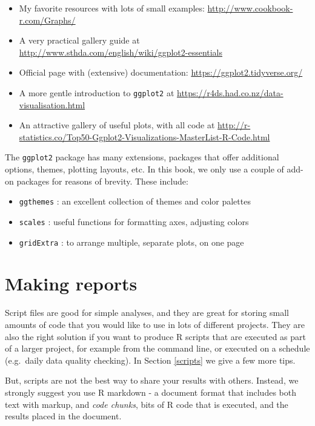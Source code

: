 \documentclass[]{book}
\providecommand{\tightlist}{%
  \setlength{\itemsep}{0pt}\setlength{\parskip}{0pt}}
\begin{document}
\begin{itemize}
\tightlist
\item
  My favorite resources with lots of small examples: \url{http://www.cookbook-r.com/Graphs/}
\item
  A very practical gallery guide at \url{http://www.sthda.com/english/wiki/ggplot2-essentials}
\item
  Official page with (extensive) documentation: \url{https://ggplot2.tidyverse.org/}
\item
  A more gentle introduction to \texttt{ggplot2} at \url{https://r4ds.had.co.nz/data-visualisation.html}
\item
  An attractive gallery of useful plots, with all code at \url{http://r-statistics.co/Top50-Ggplot2-Visualizations-MasterList-R-Code.html}
\end{itemize}

The \texttt{ggplot2} package has many extensions, packages that offer additional options, themes, plotting layouts, etc. In this book, we only use a couple of add-on packages for reasons of brevity. These include:

\begin{itemize}
\tightlist
\item
  \texttt{ggthemes} : an excellent collection of themes and color palettes
\item
  \texttt{scales} : useful functions for formatting axes, adjusting colors
\item
  \texttt{gridExtra} : to arrange multiple, separate plots, on one page
\end{itemize}

\hypertarget{rmarkdown}{%
\section{Making reports}\label{rmarkdown}}

Script files are good for simple analyses, and they are great for storing small amounts of code that you would like to use in lots of different projects. They are also the right solution if you want to produce R scripts that are executed as part of a larger project, for example from the command line, or executed on a schedule (e.g.~daily data quality checking). In Section \ref{scripts} we give a few more tips.

But, scripts are not the best way to share your results with others. Instead, we strongly suggest you use R markdown - a document format that includes both text with markup, and \emph{code chunks}, bits of R code that is executed, and the results placed in the document.
\end{document}

